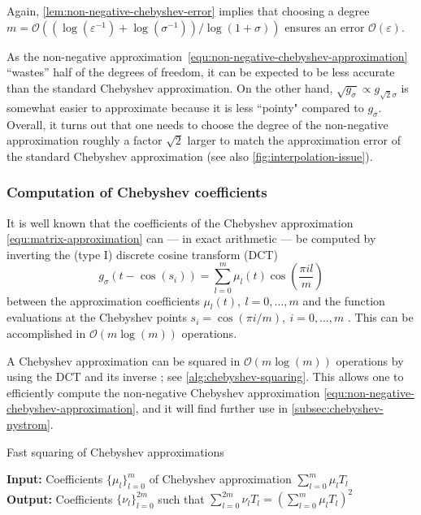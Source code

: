 Again, \cref{lem:non-negative-chebyshev-error} implies that choosing a degree $m = \mathcal{O}((\log(\varepsilon^{-1}) + \log(\sigma^{-1})) / \log(1 + \sigma))$ ensures an error $\mathcal{O}(\varepsilon)$.

As the non-negative approximation~\cref{equ:non-negative-chebyshev-approximation} ``wastes'' half of the degrees of freedom, it can be expected to be less accurate than the standard Chebyshev approximation. On the other hand, $\sqrt{g_{\sigma}} \propto g_{\sqrt{2}\sigma}$ is somewhat easier to approximate because it is less ``pointy" compared to $g_{\sigma}$. Overall, it turns out that one needs to choose the degree of the non-negative approximation roughly a factor $\sqrt{2}$ larger to match the approximation error of the standard Chebyshev approximation (see also \cref{fig:interpolation-issue}).

\subsubsection{Computation of Chebyshev coefficients}
\label{subsubsec:dct}

It is well known that the coefficients of the Chebyshev approximation \cref{equ:matrix-approximation} can --- in exact arithmetic --- be computed by inverting the (type I) discrete cosine transform (DCT)
\begin{equation*}
    g_{\sigma}(t - \cos(s_i)) = \sum_{l=0}^{m} \mu_l(t) \cos\left(\frac{\pi i l}{m} \right)
    \label{equ:discrete-cosine-transform}
\end{equation*}
between the approximation coefficients $\mu_l(t),~l=0,\dots,m$ and the function evaluations at the Chebyshev points $s_i = \cos(\pi i / m),~i=0,\dots,m$ \cite{baszenski-1997-fast-polynomial, plonka-2018-numerical-fourier, trefethen-2020-approximation-theory}. This can be accomplished in $\mathcal{O}(m \log(m))$ operations.

A Chebyshev approximation can be squared in $\mathcal{O}(m \log(m))$ operations by using the DCT and its inverse \cite{baszenski-1997-fast-polynomial}; see \cref{alg:chebyshev-squaring}. This allows one to efficiently compute the non-negative Chebyshev approximation \cref{equ:non-negative-chebyshev-approximation}, and it will find further use in \cref{subsec:chebyshev-nystrom}. 

\begin{algorithm}
    \caption{Fast squaring of Chebyshev approximations}
    \label{alg:chebyshev-squaring}
    \hspace*{\algorithmicindent} \textbf{Input:}  Coefficients $\{ \mu_l \}_{l=0}^{m}$ of Chebyshev approximation $\sum_{l=0}^{m} \mu_l T_l$\\
    \hspace*{\algorithmicindent} \textbf{Output:} Coefficients $\{ \nu_l \}_{l=0}^{2m}$ such that $\sum_{l=0}^{2m} \nu_l T_l = (\sum_{l=0}^{m} \mu_l T_l)^2$
    \begin{algorithmic}[1]
    \label{lin:inverse-DCT}
    \end{algorithmic}
\end{algorithm}

